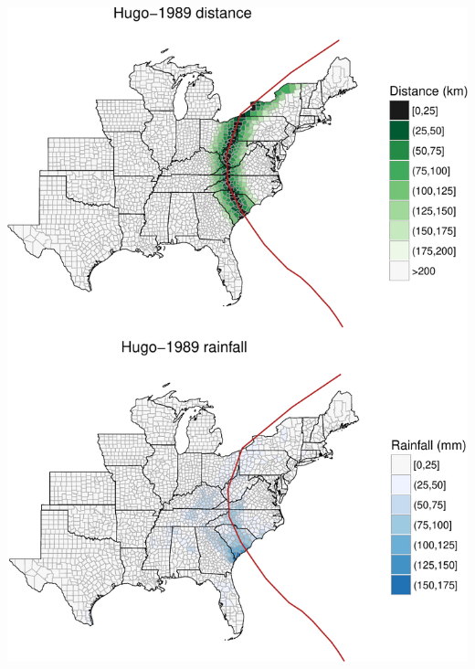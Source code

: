 \documentclass[]{elsarticle} %
\makeatletter
\def\maxwidth{\ifdim\Gin@nat@width>\linewidth\linewidth
\else\Gin@nat@width\fi}
\let\Oldincludegraphics\includegraphics
\renewcommand{\includegraphics}[1]{\Oldincludegraphics[width=\maxwidth]{#1}}
\makeatother
\begin{document}
\includegraphics{DraftExposurePaper_files/figure-latex/unnamed-chunk-2-1.pdf}
\end{document}
